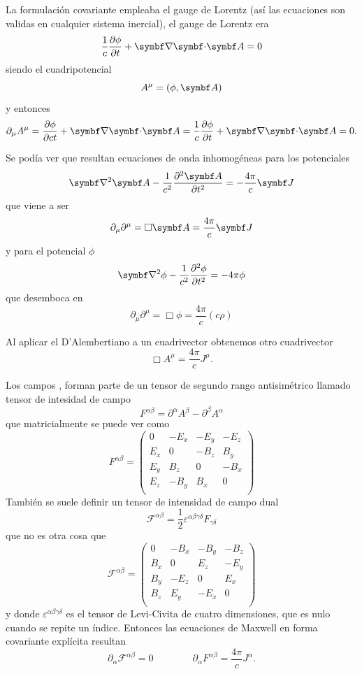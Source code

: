 \documentclass[10pt,oneside]{CBFT_book}
\begin{document}
La formulación covariante empleaba el gauge de Lorentz (así las ecuaciones son validas en cualquier sistema
inercial), el gauge de Lorentz era
\[
	\frac{1}{c} \dpar{\phi}{t} + \divem{A} = 0
\]
siendo el cuadripotencial
\[
	A^\mu = ( \phi , \vb{A} ) 
\]
y entonces 
\[
	\partial_\mu A^\mu = \dpar{\phi}{ct} + \divem{A} = \frac{1}{c} \dpar{\phi}{t} + \divem{A} = 0 .
\]

Se podía ver que resultan ecuaciones de onda inhomogéneas para los potenciales
\[
	\Nabla^2 \vb{A} - \frac{1}{c^2} \dpar[2]{\vb{A}}{t} = -\frac{4\pi}{c} \vb{J}
\]
que viene a ser 
\[
	\partial_\mu\partial^\mu = \Box \vb{A} = \frac{4\pi}{c} \vb{J}
\]
y para el potencial $\phi$
\[
	\Nabla^2 \phi - \frac{1}{c^2} \dpar[2]{\phi}{t} = - 4\pi \phi
\]
que desemboca en 
\[
	\partial_\mu\partial^\mu = \Box \phi = \frac{4\pi}{c} ( c\rho )
\]

Al aplicar el D'Alembertiano a un cuadrivector obtenemos otro cuadrivector 
\[
	\Box A^\mu = \frac{4\pi}{c} J^\mu.
\]

Los campos ,  forman parte de un tensor de segundo rango antisimétrico llamado tensor
de intesidad de campo 
\[
	F^{\alpha\beta} = \partial^\alpha A^\beta - \partial^\beta A^\alpha
\]
que matricialmente se puede ver como 
\[
	F^{\alpha\beta} =
	\begin{pmatrix}
	 0 & -E_x & -E_y & -E_z \\
	 E_x & 0 & -B_z & B_y \\
	 E_y & B_z & 0 & -B_x \\
	 E_z & -B_y & B_x & 0 \\
	\end{pmatrix}
\]
También se suele definir un tensor de intensidad de campo dual
\[
	\mathcal{F}^{\alpha\beta} =  \frac{1}{2} \varepsilon^{\alpha\beta\gamma\delta} F_{\gamma\delta}
\]
que no es otra cosa que 
\[
	\mathcal{F}^{\alpha\beta}=
	\begin{pmatrix}
	 0 & -B_x & -B_y & -B_z \\
	 B_x & 0 & E_z & -E_y \\
	 B_y & -E_z & 0 & E_x \\
	 B_z & E_y & -E_x & 0 \\
	\end{pmatrix}
\]
y donde $\varepsilon^{\alpha\beta\gamma\delta}$ es el tensor de Levi-Civita de cuatro dimensiones, que es nulo
cuando se repite un índice.
Entonces las ecuaciones de Maxwell en forma covariante explícita resultan 
\[
	\partial_\alpha \mathcal{F}^{\alpha\beta} =  0 \qquad \qquad 
	\partial_\alpha F^{\alpha\beta} =  \frac{4 \pi}{c} J^\alpha.
\]
\end{document}
